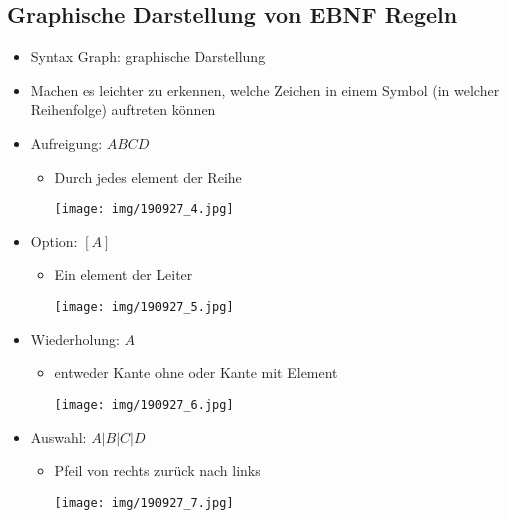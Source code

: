 \documentclass[11pt]{article}
\begin{document}
\subsection{Graphische Darstellung von EBNF Regeln}
\label{sec:org799f42f}
\begin{itemize}
\item Syntax Graph: graphische Darstellung\\
\item Machen es leichter zu erkennen, welche Zeichen in einem Symbol (in welcher Reihenfolge) auftreten können\\
\item Aufreigung: \(A B C D\)\\
\begin{itemize}
\item Durch jedes element der Reihe\\
\begin{center}
\texttt{[image: img/190927\_4.jpg]}
\end{center}
\end{itemize}
\item Option: \([A]\)\\
\begin{itemize}
\item Ein element der Leiter\\
\begin{center}
\texttt{[image: img/190927\_5.jpg]}
\end{center}
\end{itemize}
\item Wiederholung: \({A}\)\\
\begin{itemize}
\item entweder Kante ohne oder Kante mit Element\\
\begin{center}
\texttt{[image: img/190927\_6.jpg]}
\end{center}
\end{itemize}
\item Auswahl: \(A | B | C | D\)\\
\begin{itemize}
\item Pfeil von rechts zurück nach links\\
\begin{center}
\texttt{[image: img/190927\_7.jpg]}
\end{center}
\end{itemize}

\end{itemize}
\end{document}

